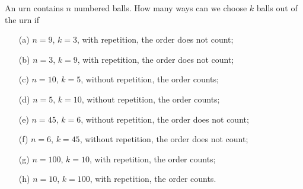 \begin{exercise}\label{ex:ballsinurn1}
An urn contains $n$ numbered balls. 
How many ways can we choose $k$ balls out of the urn if 
\begin{enumerate}
\item[(a)]
$n = 9$, $k=3$, with repetition, the order does not count; 
\item[(b)]
$n = 3$, $k=9$, with repetition, the order does not count; 
\item[(c)]
$n = 10$, $k=5$, without repetition, the order counts; 
\item[(d)]
$n = 5$, $k=10$, without repetition, the order counts; 
\item[(e)]
$n = 45$, $k=6$, without repetition, the order does not count; 
\item[(f)]
$n = 6$, $k=45$, without repetition, the order does not count; 
\item[(g)]
$n = 100$, $k=10$, with repetition, the order counts; 
\item[(h)]
$n = 10$, $k=100$, with repetition, the order counts. 
\end{enumerate}
\end{exercise}







